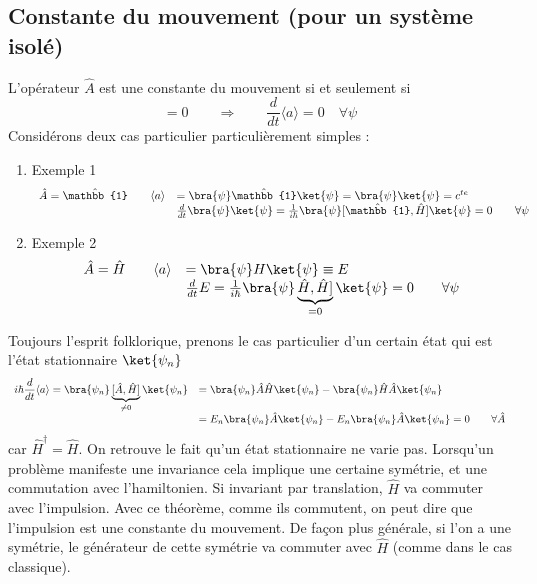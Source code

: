 	\subsection{Constante du mouvement (pour un système isolé)}
	L'opérateur $\hat{A}$ est une constante du mouvement si et seulement si
	\begin{equation}
	[\hat{A},\hat{H}] = 0\qquad\Longrightarrow\qquad\dfrac{d}{dt}\langle a\rangle = 0\quad
	\forall \psi
	\end{equation}
	Considérons deux cas particulier particulièrement simples :
	\begin{enumerate}
	\item Exemple 1 \begin{equation}
	\begin{array}{ll}
	\hat{A} = \hat{\mathbb{1}}\qquad \langle a\rangle &= \bra{\psi}\hat{\mathbb{1}}\ket{\psi}=\bra{\psi}\ket{\psi} 
	= c^{te}\\
	& \frac{d}{dt}\bra{\psi}\ket{\psi} = \frac{1}{i\hbar}\bra{\psi}[\hat{\mathbb{1}},\hat{H}]\ket{\psi}=0\qquad 
	\forall \psi
	\end{array}
	\end{equation}
	\item Exemple 2 \begin{equation}
	\begin{array}{ll}
	\hat{A} = \hat{H}\qquad \langle a\rangle &= \bra{\psi}H\ket{\psi}\equiv E\\
	& \frac{d}{dt}E = \frac{1}{i\hbar}\bra{\psi}\underbrace{\hat{H},\hat{H}]}_{=0}\ket{\psi}=0\qquad 
	\forall \psi
	\end{array}
	\end{equation}
	\end{enumerate}
	Toujours l'esprit folklorique, prenons le cas particulier d'un certain état qui est l'état 
	stationnaire $\ket{\psi_n}$
	\begin{equation}
	\begin{array}{ll}
	i\hbar \dfrac{d}{dt}\langle a\rangle = \bra{\psi_n}\underbrace{[\hat{A},\hat{H}]}_{\neq 0}\ket{\psi_n} 
	&= \bra{\psi_n}\hat{A}\hat{H}\ket{\psi_n}-\bra{\psi_n}\hat{H}\hat{A}\ket{\psi_n}\\
	&= E_n \bra{\psi_n}\hat{A}\ket{\psi_n}-E_n\bra{\psi_n}\hat{A}\ket{\psi_n}=0\qquad \forall \hat{A}
	\end{array}
	\end{equation}
	car $\hat{H}^\dagger = \hat H$. On retrouve le fait qu'un état stationnaire ne varie pas.
	Lorsqu'un problème manifeste une invariance cela implique une 	certaine symétrie, et une commutation
	avec l'hamiltonien. Si invariant par translation, $\hat H$ va commuter avec l'impulsion. Avec 
	ce théorème, comme ils commutent, on peut dire que l'impulsion est une constante du mouvement.  
	De façon plus générale, si l'on a une symétrie, le générateur de cette symétrie va commuter 
	avec $\hat{H}$ (comme dans le cas classique).\\
	
